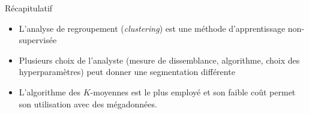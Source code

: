 \documentclass[
  ignorenonframetext,
]{beamer}
\providecommand{\tightlist}{%
  \setlength{\itemsep}{0pt}\setlength{\parskip}{0pt}}\usepackage{longtable,booktabs,array}
\begin{document}
\begin{frame}{Récapitulatif}
\protect\hypertarget{ruxe9capitulatif}{}
\begin{itemize}
\tightlist
\item
  L'analyse de regroupement (\emph{clustering}) est une méthode
  d'apprentissage non-supervisée
\item
  Plusieurs choix de l'analyste (mesure de dissemblance, algorithme,
  choix des hyperparamètres) peut donner une segmentation différente
\item
  L'algorithme des \(K\)-moyennes est le plus employé et son faible coût
  permet son utilisation avec des mégadonnées.
\end{itemize}
\end{frame}
\end{document}
